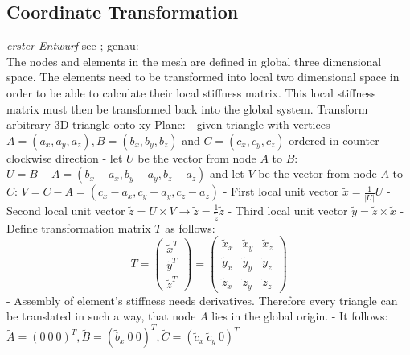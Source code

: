 \documentclass[11pt,twoside]{scrartcl}
\begin{document}
 \subsection{Coordinate Transformation} %
 \textit{erster Entwurf}\newline
 see \cite{nguyen2008smoothed}; genau: \cite{zienkiewicz2000finite}\\
 The nodes and elements in the mesh are defined in global three dimensional space. The elements need to be transformed into local two dimensional space in order to be able to calculate their local stiffness matrix. This local stiffness matrix must then be transformed back into the global system.
 Transform arbitrary 3D triangle onto xy-Plane:
 - given triangle with vertices $A=(a_x, a_y, a_z), B=(b_x, b_y, b_z)$ and $C=(c_x, c_y, c_z)$ ordered in counter-clockwise direction\newline
 - let $U$ be the vector from node $A$ to $B$: $U = B-A = (b_x-a_x, b_y-a_y,b_z-a_z)$ and let $V$ be the vector from node $A$ to $C$: $V = C-A = (c_x-a_x,c_y-a_y,c_z-a_z)$\newline
 - First local unit vector $\tilde{x} = \frac{1}{\left|U\right|}U$\newline
 - Second local unit vector $\tilde{z} = U \times V \longrightarrow \tilde{z} = \frac{1}{\tilde{z}}\tilde{z}$\newline
 - Third local unit vector $\tilde{y} = \tilde{z} \times \tilde{x}$\newline
 - Define transformation matrix $T$ as follows: \[T = \begin{pmatrix}
 \tilde{x}^T\\ \tilde{y}^T\\ \tilde{z}^T
 \end{pmatrix}
 = \begin{pmatrix}
  \tilde{x}_x & \tilde{x}_y & \tilde{x}_z\\ \tilde{y}_x & \tilde{y}_y & \tilde{y}_z\\ \tilde{z}_x & \tilde{z}_y & \tilde{z}_z
  \end{pmatrix}\]
  - Assembly of element's stiffness needs derivatives. Therefore every triangle can be translated in such a way, that node $A$ lies in the global origin.\newline
  - It follows: $\tilde{A} = \left(0\ 0\ 0\right)^T, \tilde{B} = \left(\tilde{b}_x\ 0\ 0\right)^T, \tilde{C} = \left(\tilde{c}_x\ \tilde{c}_y\ 0\right)^T$\newline
\end{document}
